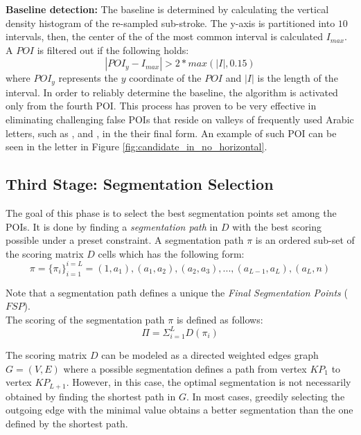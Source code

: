 \documentclass[journal,compsoc]{IEEEtran}
\begin{document}
\textbf{Baseline detection:} The baseline is determined by calculating the vertical density histogram of the re-sampled sub-stroke. The y-axis is partitioned into $10$ intervals, then, the center of the of the most common interval is calculated $I_{max}$. A $POI$ is filtered out if the following holds:
\begin{equation}
|POI_y-I_{max}|>2*max{({|I|},0.15)} 
\end{equation}
where $POI_y$ represents the $y$ coordinate of the $POI$ and $|I|$ is the length of the interval. In order to reliably determine the baseline, the algorithm is activated only from the fourth POI. This process has proven to be very effective in eliminating challenging false POIs that reside on valleys of frequently used Arabic letters, such as ,  and , in the their final form. An example of such POI can be seen in the letter  in Figure \ref{fig:candidate_in_no_horizontal}. 

\subsection{Third Stage: Segmentation Selection}
The goal of this phase is to select the best segmentation points set among the POIs. It is done by finding a \emph{segmentation path} in $D$ with the best scoring possible under a preset constraint. A segmentation path $\pi$ is an ordered sub-set of the scoring matrix $D$ cells which has the following form: 
\begin{equation}
\pi=\{\pi_i\}_{i=1}^{i=L}=(1,a_{1}),(a_{1},a_{2}),(a_{2},a_{3}),...,(a_{L-1},a_{L}),(a_{L},n)
\end{equation}

Note that a segmentation path defines a unique the \emph{Final Segmentation Points} ($FSP$).\\

The scoring of the segmentation path $\pi$ is defined as follows:
\begin{equation}
\Pi = \Sigma_{i=1}^{L}{D(\pi_{i})}
\end{equation}

The scoring matrix $D$ can be modeled as a directed weighted edges graph $G=(V,E)$ where a possible segmentation defines a path from vertex $KP_1$ to vertex $KP_{L+1}$. However, in this case, the optimal segmentation is not necessarily obtained by finding the shortest path in $G$. In most cases, greedily selecting the outgoing edge with the minimal value obtains a better segmentation than the one defined by the shortest path.\\
\end{document}
